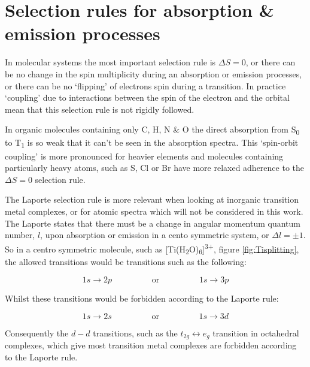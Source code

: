 \documentclass[
]{book}
\begin{document}
\hypertarget{sec:selectionrules}{%
\section{Selection rules for absorption \& emission processes}\label{sec:selectionrules}}

In molecular systems the most important selection rule is \(\Delta S = 0\), or there can be no change in the spin multiplicity during an absorption or emission processes, or there can be no `flipping' of electrons spin during a transition. In practice `coupling' due to interactions between the spin of the electron and the orbital mean that this selection rule is not rigidly followed.

In organic molecules containing only C, H, N \& O the direct absorption from S\textsubscript{0} to T\textsubscript{1} is so weak that it can't be seen in the absorption spectra. This `spin-orbit coupling' is more pronounced for heavier elements and molecules containing particularly heavy atoms, such as S, Cl or Br have more relaxed adherence to the \(\Delta S = 0\) selection rule.

The Laporte selection rule is more relevant when looking at inorganic transition metal complexes, or for atomic spectra which will not be considered in this work. The Laporte states that there must be a change in angular momentum quantum number, \(l\), upon absorption or emission in a cento symmetric system, or \(\Delta l = \pm 1\). So in a centro symmetric molecule, such as {[}Ti(H\textsubscript{2}O)\textsubscript{6}{]}\textsuperscript{3+}, figure \ref{fig:Tisplitting}, the allowed transitions would be transitions such as the following:

\begin{equation*}
1s \longrightarrow 2p \hspace{2cm}\textrm{or} \hspace{2cm} 1s \longrightarrow 3p
\end{equation*}

Whilst these transitions would be forbidden according to the Laporte rule:

\begin{equation*}
1s \longrightarrow 2s \hspace{2cm}\textrm{or} \hspace{2cm} 1s \longrightarrow 3d
\end{equation*}

Consequently the \(d-d\) transitions, such as the \(t_{2g} \longleftrightarrow e_g\) transition in octahedral complexes, which give most transition metal complexes are forbidden according to the Laporte rule.
\end{document}
